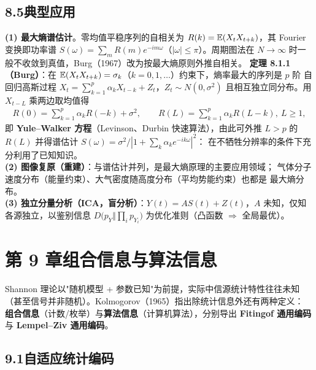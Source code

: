 \subsection{8.5\quad 典型应用}

\textbf{(1) 最大熵谱估计}。零均值平稳序列的自相关为
$R(k)=\operatorname{\mathbb{E}}(X_tX_{t+k})$，其 Fourier 变换即功率谱
$S(\omega)=\sum_{m}R(m)e^{-im\omega}$（$|\omega|\le\pi$）。周期图法在
$N\to\infty$ 时一般不收敛到真值，Burg（1967）改为按最大熵原则外推自相关。
\textbf{定理 8.1.1（Burg）}：在
$\operatorname{\mathbb{E}}(X_tX_{t+k})=\sigma_k$（$k=0,1,\dots$）约束下，熵率最大的序列是 $p$ 阶
自回归高斯过程 $X_t=\sum_{k=1}^{p}\alpha_kX_{t-k}+Z_t$，$Z_t\sim N(0,\sigma^{2})$
且相互独立同分布。用 $X_{t-L}$ 乘两边取均值得
\begin{align*}
R(0)=\sum_{k=1}^{p}\alpha_kR(-k)+\sigma^{2},\qquad
R(L)=\sum_{k=1}^{p}\alpha_kR(L-k),\ L\ge1,
\end{align*}
即 \textbf{Yule--Walker 方程}（Levinson、Durbin 快速算法），由此可外推 $L>p$
的 $R(L)$ 并得谱估计 $S(\omega)=\sigma^{2}/|1+\sum_k\alpha_ke^{-ik\omega}|^{2}$：
在不牺牲分辨率的条件下充分利用了已知知识。\\
\textbf{(2) 图像复原（重建）}：与谱估计并列，是最大熵原理的主要应用领域；
气体分子速度分布（能量约束）、大气密度随高度分布（平均势能约束）也都是
最大熵分布。\\
\textbf{(3) 独立分量分析（ICA，盲分析）}：$Y(t)=AS(t)+Z(t)$，$A$ 未知，仅知
各源独立，以鉴别信息 $D\bigl(p_Y\Vert\prod_ip_{Y_i}\bigr)$ 为优化准则（凸函数
$\Rightarrow$ 全局最优）。

\section{第 9 章\quad 组合信息与算法信息}

Shannon 理论以"随机模型 + 参数已知"为前提，实际中信源统计特性往往未知
（甚至信号并非随机）。Kolmogorov（1965）指出除统计信息外还有两种定义：
\textbf{组合信息}（计数/枚举）与\textbf{算法信息}（计算机算法），分别导出
\textbf{Fitingof 通用编码}与 \textbf{Lempel--Ziv 通用编码}。

\subsection{9.1\quad 自适应统计编码}

